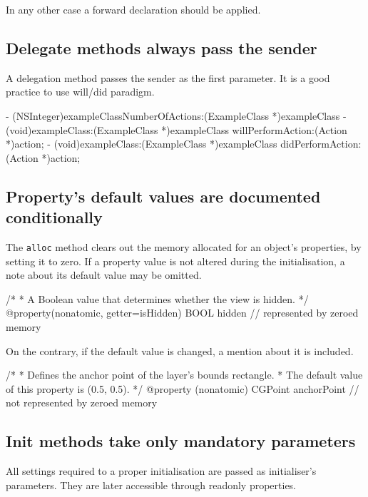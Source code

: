 \documentclass[10pt]{extarticle}
\newcommand{\inlinecode}[1]{{\textcolor{TundoraColor}{\texttt{#1}}}}
\begin{document}
In any other case a forward declaration should be applied.


\subsection{Delegate methods always pass the sender}

A delegation method passes the sender as the first parameter. It is a good practice to use will/did paradigm.

\begin{codelisting}
- (NSInteger)exampleClassNumberOfActions:(ExampleClass *)exampleClass
- (void)exampleClass:(ExampleClass *)exampleClass willPerformAction:(Action *)action;
- (void)exampleClass:(ExampleClass *)exampleClass didPerformAction:(Action *)action;
\end{codelisting}


\subsection{Property's default values are documented conditionally}

The \inlinecode{alloc} method clears out the memory allocated for an object’s properties, by setting it to zero. If a property value is not altered during the initialisation, a note about its default value may be omitted.

\begin{codelisting}
/*
 * A Boolean value that determines whether the view is hidden.
 */
@property(nonatomic, getter=isHidden) BOOL hidden                // represented by zeroed memory
\end{codelisting}

On the contrary, if the default value is changed, a mention about it is included.

\begin{codelisting}
/*
 * Defines the anchor point of the layer's bounds rectangle.
 * The default value of this property is (0.5, 0.5).
 */
@property (nonatomic) CGPoint anchorPoint                       // not represented by zeroed memory
\end{codelisting}

\subsection{Init methods take only mandatory parameters}

All settings required to a proper initialisation are passed as initialiser's parameters. They are later accessible through readonly properties.
\end{document}
